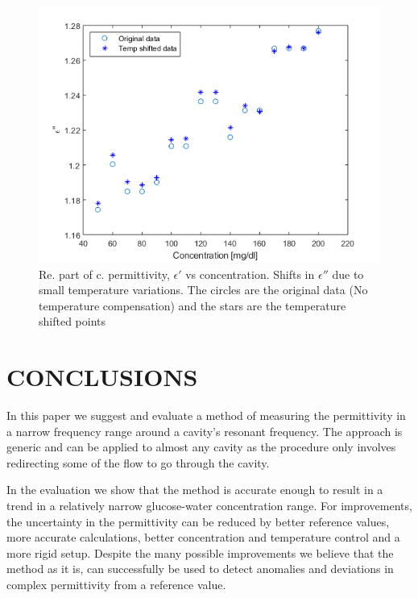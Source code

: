 \documentclass[10pt,final,conference,a4paper,twocolumn]{IEEEtran_AntennEMB_GigaHertz2016}
\begin{document}
\begin{figure}[t]
	\centering
	\includegraphics[width=1.0\columnwidth]{pumpgluzoomEIM.png}
	\caption{Re. part of c. permittivity, $\epsilon'$ vs concentration. Shifts in $\epsilon''$ due to small temperature variations. The circles are the original data (No temperature compensation) and the stars are the temperature shifted points}
	\label{fig:eim}
\end{figure}





\section{CONCLUSIONS}
In this paper we suggest and evaluate a method of measuring the permittivity in a narrow frequency range around a cavity's resonant frequency. The approach is generic and can be applied to almost any cavity as the procedure only involves redirecting some of the flow to go through the cavity.

In the evaluation we show that the method is accurate enough to result in a trend in a relatively narrow glucose-water concentration range. For improvements, the uncertainty in the permittivity can be reduced by better reference values, more accurate calculations, better concentration and temperature control and a more rigid setup. Despite the many possible improvements we believe that the method as it is, can successfully be used to detect anomalies and deviations in complex permittivity from a reference value.
\end{document}

